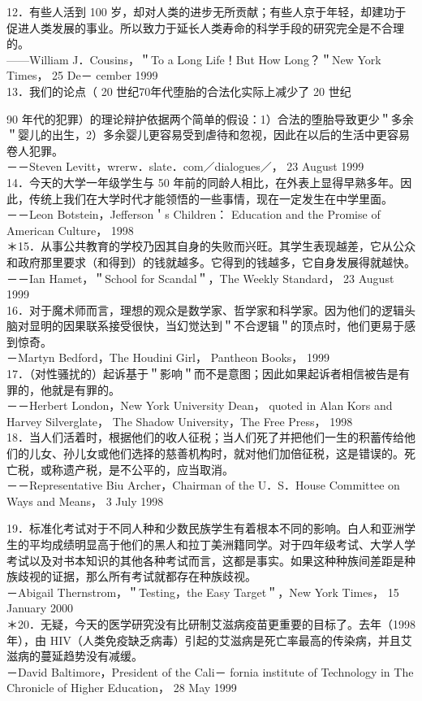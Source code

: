 12．有些人活到 100 岁，却对人类的进步无所贡献；有些人京于年轻，却建功于促进人类发展的事业。所以致力于延长人类寿命的科学手段的研究完全是不合理的。\\
——William J．Cousins，＂To a Long Life！But How Long？＂New York Times， 25 De－ cember 1999\\
13．我们的论点（ 20 世纪70年代堕胎的合法化实际上减少了 20 世纪

90 年代的犯罪）的理论辩护依据两个简单的假设：1）合法的堕胎导致更少＂多余＂婴儿的出生，2）多余婴儿更容易受到虐待和忽视，因此在以后的生活中更容易卷人犯罪。\\
－－Steven Levitt，wrerw．slate．com／dialogues／， 23 August 1999\\
14．今天的大学一年级学生与 50 年前的同龄人相比，在外表上显得早熟多年。因此，传统上我们在大学时代才能领悟的一些事情，现在一定发生在中学里面。\\
－－Leon Botstein，Jefferson＇s Children： Education and the Promise of American Culture， 1998\\
＊15．从事公共教育的学校乃因其自身的失败而兴旺。其学生表现越差，它从公众和政府那里要求（和得到）的钱就越多。它得到的钱越多，它自身发展得就越快。\\
－－Ian Hamet，＂School for Scandal＂，The Weekly Standard， 23 August 1999\\
16．对于魔术师而言，理想的观众是数学家、哲学家和科学家。因为他们的逻辑头脑对显明的因果联系接受很快，当幻觉达到＂不合逻辑＂的顶点时，他们更易于感到惊奇。\\
－Martyn Bedford，The Houdini Girl， Pantheon Books， 1999\\
17．（对性骚扰的）起诉基于＂影响＂而不是意图；因此如果起诉者相信被告是有罪的，他就是有罪的。\\
－－Herbert London，New York University Dean， quoted in Alan Kors and Harvey Silverglate， The Shadow University，The Free Press， 1998\\
18．当人们活着时，根据他们的收人征税；当人们死了并把他们一生的积蓄传给他们的儿女、孙儿女或他们选择的慈善机构时，就对他们加倍征税，这是错误的。死亡税，或称遗产税，是不公平的，应当取消。\\
－－Representative Biu Archer，Chairman of the U．S．House Committee on Ways and Means， 3 July 1998

19．标准化考试对于不同人种和少数民族学生有着根本不同的影响。白人和亚洲学生的平均成绩明显高于他们的黑人和拉丁美洲籍同学。对于四年级考试、大学人学考试以及对书本知识的其他各种考试而言，这都是事实。如果这种种族间差距是种族歧视的证据，那么所有考试就都存在种族歧视。\\
－Abigail Thernstrom，＂Testing，the Easy Target＂，New York Times， 15 January 2000\\
＊20．无疑，今天的医学研究没有比研制艾滋病疫苗更重要的目标了。去年（1998 年），由 HIV（人类免疫缺乏病毒）引起的艾滋病是死亡率最高的传染病，并且艾滋病的蔓延趋势没有减缓。\\
－David Baltimore，President of the Cali－ fornia institute of Technology in The Chronicle of Higher Education， 28 May 1999

